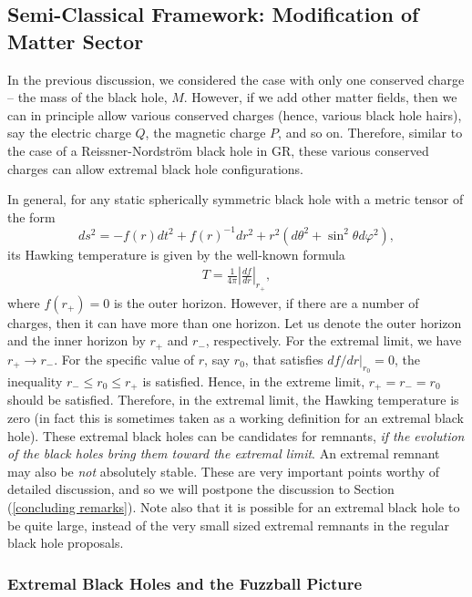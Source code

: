 \documentclass[12pt]{article}
\newcommand{\2}{$^2$}
\newcommand{\3}{$^3$}
\newcommand{\4}{$_4$}
\newcommand{\5}{$_5$}
\begin{document}
\subsection{Semi-Classical Framework: Modification of Matter Sector}

In the previous discussion, we considered the case with only one conserved charge -- the mass of the black hole, $M$. However, if we add other matter fields, then we can in principle allow various conserved charges (hence, various black hole hairs), say the electric charge $Q$, the magnetic charge $P$, and so on. Therefore, similar to the case of a Reissner-Nordstr\"om black hole in GR, these various conserved charges can allow extremal black hole configurations.



In general, for any static spherically symmetric black hole with a metric tensor of the form
\begin{equation}
ds^2 = -f(r) dt^2 + f(r)^{-1}dr^2 + r^2(d\theta^2 + \sin^2\theta d\varphi^2),
\end{equation}
its Hawking temperature is given by the well-known formula
\begin{eqnarray}
T = \frac{1}{4\pi} \left|\frac{df}{dr}\right|_{r_{+}},
\end{eqnarray}
where $f(r_{+}) = 0$ is the outer horizon. However, if there are a number of charges, then it can have more than one horizon. Let us denote the outer horizon and the inner horizon by $r_{+}$ and $r_{-}$, respectively. For the extremal limit, we have $r_{+} \to r_{-}$. For the specific value of $r$, say $r_{0}$, that satisfies $df/dr|_{r_{0}} = 0$, the inequality $r_{-} \leqslant r_{0} \leqslant r_{+}$ is satisfied. Hence, in the extreme limit, $r_{+} = r_{-} = r_{0}$ should be satisfied. Therefore, in the extremal limit, the Hawking temperature is zero (in fact this is sometimes taken as a working definition for an extremal black hole). These extremal black holes can be candidates for remnants, \emph{if the evolution of the black holes bring them toward the extremal limit}. An extremal remnant may also be \emph{not} absolutely stable. These are very important points worthy of detailed discussion, and so we will postpone the discussion to Section (\ref{concluding remarks}). 
Note also that it is possible for an extremal black hole to be quite large, instead of the very small sized extremal remnants in the regular black hole proposals.

\subsubsection{Extremal Black Holes and the Fuzzball Picture}
\end{document}
